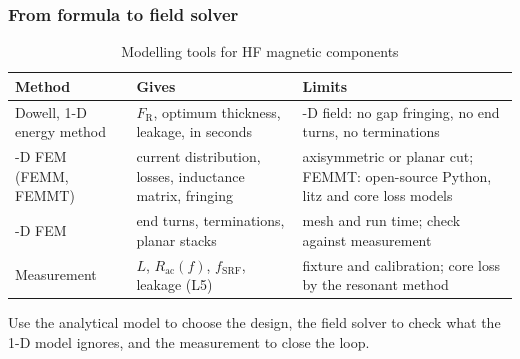 \begin{frame}
	\frametitle{From formula to field solver}
	\begin{table}
		\centering
		\footnotesize
		\begin{tabular}{|>{\raggedright\arraybackslash}p{2.6cm}|>{\raggedright\arraybackslash}p{4.6cm}|>{\raggedright\arraybackslash}p{5.6cm}|}
			\hline
			\textbf{Method}                         & \textbf{Gives}                                                 & \textbf{Limits}                                                                  \\
			\hline
			Dowell, 1-D energy method               & $F_\mathrm{R}$, optimum thickness, leakage, in seconds         & 1-D field: no gap fringing, no end turns, no terminations                        \\
			2-D FEM (FEMM, FEMMT)                   & current distribution, losses, inductance matrix, fringing      & axisymmetric or planar cut; FEMMT: open-source Python, litz and core loss models  \\
			3-D FEM                                 & end turns, terminations, planar stacks                          & mesh and run time; check against measurement                                     \\
			Measurement                             & $L$, $R_\mathrm{ac}(f)$, $f_\mathrm{SRF}$, leakage (L5)         & fixture and calibration; core loss by the resonant method                        \\
			\hline
		\end{tabular}
		\caption{Modelling tools for HF magnetic components}
	\end{table}
	\small
	Use the analytical model to choose the design, the field solver to check what the 1-D model ignores, and the measurement to close the loop.
\end{frame}

